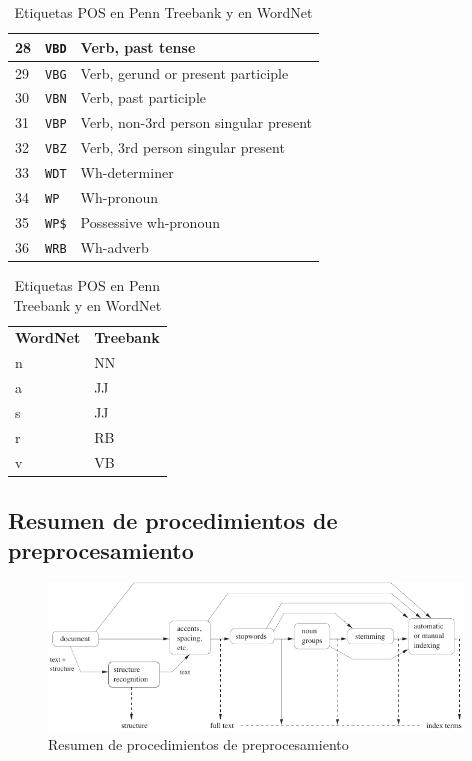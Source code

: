 \begin{table}[htbp]
\begin{subtable}[t]{0.60\linewidth}
\begin{tabular}{|l|l|l|}
28 & \verb=VBD= & Verb, past tense \\ \hline
29 & \verb=VBG= & Verb, gerund or present participle \\ \hline
30 & \verb=VBN= & Verb, past participle \\ \hline
31 & \verb=VBP= & Verb, non-3rd person singular present \\ \hline
32 & \verb=VBZ= & Verb, 3rd person singular present \\ \hline
33 & \verb=WDT= & Wh-determiner \\ \hline
34 & \verb=WP= & Wh-pronoun \\ \hline
35 & \verb=WP$= & Possessive wh-pronoun \\ \hline
36 & \verb=WRB= & Wh-adverb \\ \hline
\end{tabular}
\caption{POS tags del Penn Treebank}
\label{tbl:pos-tags-peen-treebank}
\end{subtable}
\begin{subtable}{0.38\linewidth}
\centering
\begin{tabular}{|l|l|}
\hline
\textbf{WordNet} & \textbf{Treebank} \\ \hhline{==}
n & NN \\ \hline
a & JJ \\ \hline
s & JJ \\ \hline
r & RB \\ \hline
v & VB \\ \hline
\end{tabular}
\caption{POS tags correspondientes en WordNet}
\label{tbl:pos-tags-wordnet}
\end{subtable}
\caption{Etiquetas POS en Penn Treebank y en WordNet}
\label{tbl:pos-tags}
\end{table}

\subsection{Resumen de procedimientos de preprocesamiento}

\begin{figure}[H]
\includegraphics[width=0.98\textwidth]{procesamiento-textos-mod-ir}
\caption[Resumen de procedimientos de preprocesamiento]{Resumen de procedimientos de preprocesamiento \citep[ch. 7]{Baeza-Yates2011}}
\end{figure}


